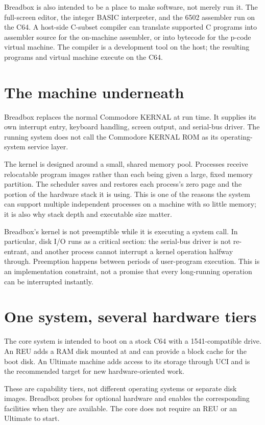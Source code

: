 Breadbox is also intended to be a place to make software, not merely run it. The  full-screen editor, the integer BASIC interpreter, and the 6502 assembler run on the C64. A host-side C-subset compiler can translate supported C programs into assembler source for the on-machine assembler, or into bytecode for the p-code virtual machine. The compiler is a development tool on the host; the resulting programs and virtual machine execute on the C64.

\section{The machine underneath}

Breadbox replaces the normal Commodore KERNAL at run time. It supplies its own interrupt entry, keyboard handling, screen output, and serial-bus driver. The running system does not call the Commodore KERNAL ROM as its operating-system service layer.

The kernel is designed around a small, shared memory pool. Processes receive relocatable program images rather than each being given a large, fixed memory partition. The scheduler saves and restores each process's zero page and the portion of the hardware stack it is using. This is one of the reasons the system can support multiple independent processes on a machine with so little memory; it is also why stack depth and executable size matter.

Breadbox's kernel is not preemptible while it is executing a system call. In particular, disk I/O runs as a critical section: the serial-bus driver is not re-entrant, and another process cannot interrupt a kernel operation halfway through. Preemption happens between periods of user-program execution. This is an implementation constraint, not a promise that every long-running operation can be interrupted instantly.

\section{One system, several hardware tiers}

The core system is intended to boot on a stock C64 with a 1541-compatible drive. An REU adds a RAM disk mounted at  and can provide a block cache for the boot disk. An Ultimate machine adds access to its storage through UCI and is the recommended target for new hardware-oriented work.

These are capability tiers, not different operating systems or separate disk images. Breadbox probes for optional hardware and enables the corresponding facilities when they are available. The core does not require an REU or an Ultimate to start.

